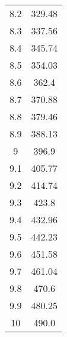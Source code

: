 \documentclass{article}
\begin{document}
\begin{longtable}[c]{| c | c |}
8.2 & 329.48\\
8.3 & 337.56\\
8.4 & 345.74\\
8.5 & 354.03\\
8.6 & 362.4\\
8.7 & 370.88\\
8.8 & 379.46\\
8.9 & 388.13\\
9 & 396.9\\
9.1 & 405.77\\
9.2 & 414.74\\
9.3 & 423.8\\
9.4 & 432.96\\
9.5 & 442.23\\
9.6 & 451.58\\
9.7 & 461.04\\
9.8 & 470.6\\
9.9 & 480.25\\
10 & 490.0\\



\end{longtable}
\end{document}
